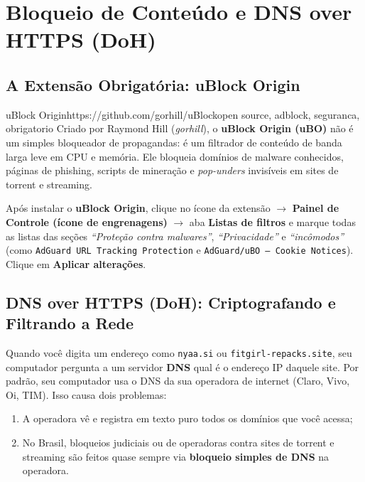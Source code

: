 \documentclass{pousadaguide}
\begin{document}
\section{Bloqueio de Conteúdo e DNS over HTTPS (DoH)}

\subsection{A Extensão Obrigatória: uBlock Origin}

\begin{ferramenta}[goat,logo=ublock-origin]{uBlock Origin}{https://github.com/gorhill/uBlock}{open source, adblock, seguranca, obrigatorio}
Criado por Raymond Hill (\emph{gorhill}), o \textbf{uBlock Origin (uBO)} não é um simples bloqueador de propagandas: é um filtrador de conteúdo de banda larga leve em CPU e memória. Ele bloqueia domínios de malware conhecidos, páginas de phishing, scripts de mineração e \emph{pop-unders} invisíveis em sites de torrent e streaming. 
\end{ferramenta}

\begin{dica}
Após instalar o \textbf{uBlock Origin}, clique no ícone da extensão $\rightarrow$ \textbf{Painel de Controle (ícone de engrenagens)} $\rightarrow$ aba \textbf{Listas de filtros} e marque todas as listas das seções \emph{``Proteção contra malwares''}, \emph{``Privacidade''} e \emph{``incômodos''} (como \texttt{AdGuard URL Tracking Protection} e \texttt{AdGuard/uBO -- Cookie Notices}). Clique em \textbf{Aplicar alterações}.
\end{dica}

\subsection{DNS over HTTPS (DoH): Criptografando e Filtrando a Rede}

Quando você digita um endereço como \texttt{nyaa.si} ou \texttt{fitgirl-repacks.site}, seu computador pergunta a um servidor \textbf{DNS} qual é o endereço IP daquele site. Por padrão, seu computador usa o DNS da sua operadora de internet (Claro, Vivo, Oi, TIM). Isso causa dois problemas:
\begin{enumerate}
  \item A operadora vê e registra em texto puro todos os domínios que você acessa;
  \item No Brasil, bloqueios judiciais ou de operadoras contra sites de torrent e streaming são feitos quase sempre via \textbf{bloqueio simples de DNS} na operadora.
\end{enumerate}
\end{document}
